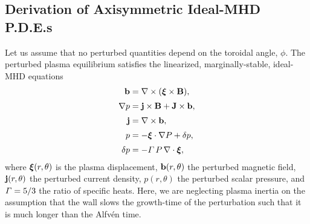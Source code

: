 \documentclass[12pt,prb,aps]{revtex4-1}
\newcommand {\bxi}{\mbox{\boldmath$\xi$}}
\begin{document}
\subsection{Derivation of Axisymmetric Ideal-MHD P.D.E.s}\label{pde}
Let us assume that no perturbed quantities depend on  the toroidal angle, $\phi$. 
The perturbed plasma equilibrium satisfies the  linearized, marginally-stable, ideal-MHD equations\,\cite{connor,am1,gs1}
\begin{align}
{\bf b} &= \nabla\times (\bxi\times {\bf B}),\label{e21}\\[0.5ex]
\nabla p &={\bf j}\times {\bf B}  +{\bf J}\times {\bf b},\label{e22}\\[0.5ex]
{\bf j} &= \nabla\times {\bf b},\label{e23}\\[0.5ex]
p&= -\bxi\cdot\nabla P+\delta p,\label{e24}\\[0.5ex]
\delta p &= - {\mit\Gamma}\,P\,\nabla\cdot\bxi,\label{e25ii}
\end{align}
where $\bxi(r,\theta)$ is the plasma displacement, ${\bf b}(r,\theta)$ the perturbed magnetic field,
${\bf j}(r,\theta)$ the perturbed current density, $p(r,\theta)$ the perturbed scalar pressure, and ${\mit\Gamma}=5/3$ the ratio of specific heats.
Here, we are neglecting plasma inertia on the assumption that the wall slows the growth-time of the perturbation such that it is much longer than the Alfv\'{e}n time. 
\end{document}
